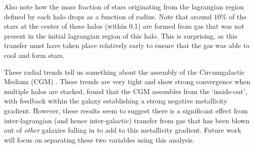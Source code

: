 Also note how the mass fraction of stars originating from the lagrangian
region defined by each halo drops as a function of radius. Note that around
$10$\% of the stars at the center of these halos (within 0.1\rvir{})
are formed from gas that was not present in the initial lagrangian region of
this halo. This is surprising, as this transfer must have taken place
relatively early to ensure that the gas was able to cool and form stars.

These radial trends tell us something about the assembly of the
Circumgalactic Medium (CGM) \citep{tumlinson2017}. These trends are very
tight and show strong convergence when multiple halos are stacked.
\citet{Crain2013} found that the CGM assembles from the `inside-out', with
feedback within the galaxy establishing a strong negative metallicity
gradient. However, these results seem to suggest there is a significant
effect from inter-lagrangian (and hence inter-galactic) transfer from gas
that has been blown out of \emph{other} galaxies falling in to add to this
metallicity gradient. Future work will focus on separating these two
variables using this analysis.

